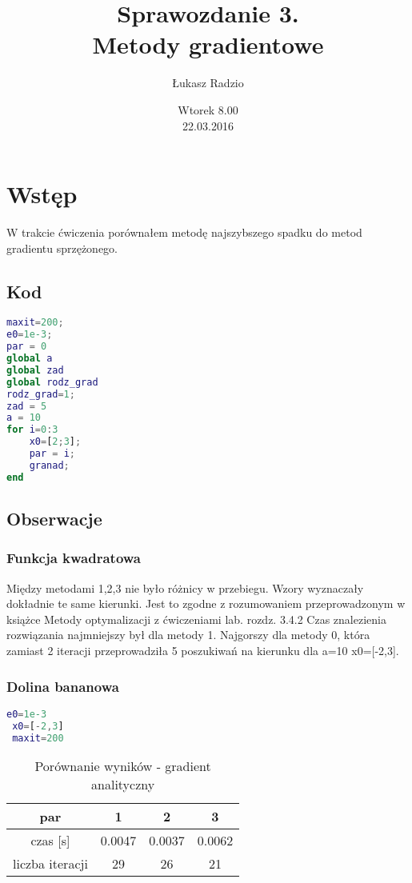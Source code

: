 \documentclass[11pt,a4paper]{article}
\author{Łukasz Radzio}
\title{Sprawozdanie 3.\\ Metody gradientowe }
\date{Wtorek 8.00\\22.03.2016}
\begin{document}
\maketitle
\section{Wstęp}
W trakcie ćwiczenia porównałem metodę najszybszego spadku do metod gradientu sprzężonego.
\subsection{Kod}

\begin{lstlisting}[language=matlab]
% testy
maxit=200;
e0=1e-3;
par = 0
global a
global zad
global rodz_grad
rodz_grad=1;
zad = 5
a = 10
for i=0:3
    x0=[2;3];
    par = i;
    granad; 
end		     
	 \end{lstlisting}

\subsection{Obserwacje}
\subsubsection{Funkcja kwadratowa}
 Między metodami 1,2,3 nie było różnicy w przebiegu. Wzory wyznaczały
 dokładnie te same kierunki. Jest to zgodne z rozumowaniem przeprowadzonym
 w książce Metody optymalizacji z ćwiczeniami lab. rozdz. 3.4.2
 Czas znalezienia rozwiązania najmniejszy był dla metody 1. Najgorszy dla
 metody 0, która zamiast 2 iteracji przeprowadziła 5 poszukiwań na
 kierunku dla a=10 x0=[-2,3].

\subsubsection{Dolina bananowa}
\begin{lstlisting}[language=matlab]
 e0=1e-3
 x0=[-2,3]
 maxit=200
 \end{lstlisting}
 
 \begin{table}[H]
	\centering
	\caption{Porównanie wyników - gradient analityczny}
	\begin{tabular}{|c|c|c|c|}
		\hline
		 par & 1 & 2 & 3\\
		\hline
		 czas [s] & 0.0047 & 0.0037 & 0.0062\\
		 \hline
		 liczba iteracji & 29 & 26 & 21\\
		 \hline
		\end{tabular}
\end{table}
\end{document}
